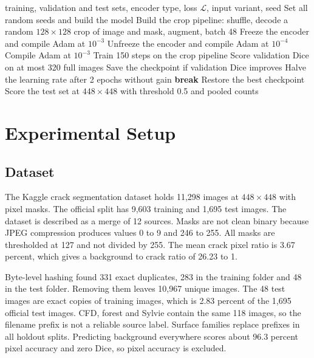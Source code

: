 \documentclass[conference]{IEEEtran}
\begin{document}
\begin{algorithm}[t]
\caption{Training and evaluation of one run}
\label{alg:train}
\begin{algorithmic}[1]
\Require training, validation and test sets, encoder type, loss $\mathcal{L}$, input variant, seed
\State Set all random seeds and build the model
\State Build the crop pipeline: shuffle, decode a random $128\times128$ crop of image and mask, augment, batch 48
    \State Freeze the encoder and compile Adam at $10^{-3}$
    \State Unfreeze the encoder and compile Adam at $10^{-4}$
    \State Compile Adam at $10^{-3}$
  \EndIf
  \State Train 150 steps on the crop pipeline
  \State Score validation Dice on at most 320 full images
  \State Save the checkpoint if validation Dice improves
  \State Halve the learning rate after 2 epochs without gain
    \State \textbf{break}
  \EndIf
\EndFor
\State Restore the best checkpoint
\State Score the test set at $448\times448$ with threshold 0.5 and pooled counts
\end{algorithmic}
\end{algorithm}

\section{Experimental Setup}
\label{sec:setup}
\subsection{Dataset}
The Kaggle crack segmentation dataset holds 11,298 images at $448\times448$ with pixel masks. The official split has 9,603 training and 1,695 test images. The dataset is described as a merge of 12 sources. Masks are not clean binary because JPEG compression produces values 0 to 9 and 246 to 255. All masks are thresholded at 127 and not divided by 255. The mean crack pixel ratio is 3.67 percent, which gives a background to crack ratio of 26.23 to 1.

Byte-level hashing found 331 exact duplicates, 283 in the training folder and 48 in the test folder. Removing them leaves 10,967 unique images. The 48 test images are exact copies of training images, which is 2.83 percent of the 1,695 official test images. CFD, forest and Sylvie contain the same 118 images, so the filename prefix is not a reliable source label. Surface families replace prefixes in all holdout splits. Predicting background everywhere scores about 96.3 percent pixel accuracy and zero Dice, so pixel accuracy is excluded.
\end{document}
